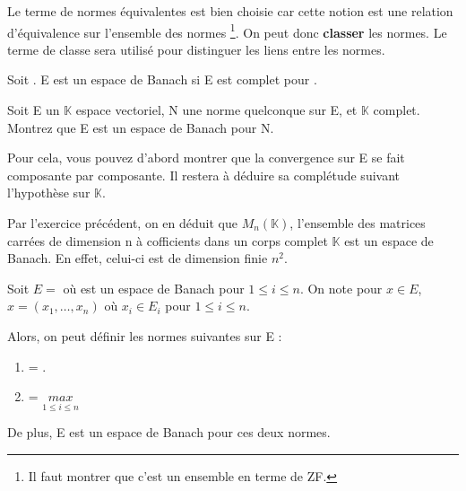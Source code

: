 Le terme de normes équivalentes est bien choisie car cette notion est une
relation d'équivalence sur l'ensemble des normes \footnote{Il faut montrer que
c'est un ensemble en terme de ZF.}.
On peut donc \textbf{classer} les normes. Le terme de classe sera utilisé pour
distinguer les liens entre les normes.

\begin{definition}
	Soit . E est un espace de Banach si E est
	complet pour .
\end{definition}

\begin{exercice}
	Soit E un $\mathbb{K}$ espace vectoriel, N une norme quelconque sur E, et
	$\mathbb{K}$ complet. 
	Montrez que E est un espace de Banach pour N.
	
	Pour cela, vous pouvez d'abord montrer que la convergence sur E se fait
	composante par composante. Il restera à déduire sa complétude suivant
	l'hypothèse sur $\mathbb{K}$.
\end{exercice}

\begin{exemple}
	Par l'exercice précédent, on en déduit que $M_{n}(\mathbb{K})$, l'ensemble
	des matrices carrées de dimension n à cofficients dans un corps complet
	$\mathbb{K}$ est un espace de Banach. En effet, celui-ci est de dimension
	finie $n^{2}$.
\end{exemple}


\begin{proposition}
	\label{product_norm_space}
	Soit $E = $ où 
	est un espace de Banach pour $1 \leq i \leq n$.
	On note pour $x \in E$, $x = (x_{1}, \ldots, x_{n})$ où $x_{i} \in
	E_{i}$ pour $1 \leq i \leq n$.
	
	Alors, on peut définir les normes suivantes sur E :
	\begin{enumerate}
		\item {} = .
		\item {} = $\underset{1 \leq i \leq
			n}{max}$
	\end{enumerate}

	De plus, E est un espace de Banach pour ces deux normes.
\end{proposition}

